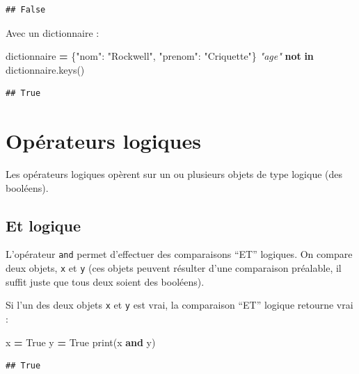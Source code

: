 \documentclass[
  12pt,
]{book}
\newenvironment{Shaded}{\begin{snugshade}}{\end{snugshade}}
\newcommand{\BuiltInTok}[1]{#1}
\newcommand{\CommentTok}[1]{\textcolor[rgb]{0.56,0.35,0.01}{\textit{#1}}}
\newcommand{\KeywordTok}[1]{\textcolor[rgb]{0.13,0.29,0.53}{\textbf{#1}}}
\newcommand{\NormalTok}[1]{#1}
\newcommand{\OperatorTok}[1]{\textcolor[rgb]{0.81,0.36,0.00}{\textbf{#1}}}
\newcommand{\StringTok}[1]{\textcolor[rgb]{0.31,0.60,0.02}{#1}}
\newcommand{\VariableTok}[1]{\textcolor[rgb]{0.00,0.00,0.00}{#1}}
\numberwithin{equation}{section}
\numberwithin{countremarque}{section}
\begin{document}
\begin{lstlisting}
## False
\end{lstlisting}

Avec un dictionnaire :

\begin{Shaded}
\begin{Highlighting}[]
\NormalTok{dictionnaire }\OperatorTok{=}\NormalTok{ \{}\StringTok{"nom"}\NormalTok{: }\StringTok{"Rockwell"}\NormalTok{, }\StringTok{"prenom"}\NormalTok{: }\StringTok{"Criquette"}\NormalTok{\}}
\CommentTok{"age"} \KeywordTok{not} \KeywordTok{in}\NormalTok{ dictionnaire.keys()}
\end{Highlighting}
\end{Shaded}

\begin{lstlisting}
## True
\end{lstlisting}

\section{Opérateurs logiques}\label{operateurs-logiques}

Les opérateurs logiques opèrent sur un ou plusieurs objets de type logique (des booléens).

\subsection{Et logique}\label{et-logique}

L'opérateur \texttt{and} permet d'effectuer des comparaisons ``ET'' logiques. On compare deux objets, \texttt{x} et \texttt{y} (ces objets peuvent résulter d'une comparaison préalable, il suffit juste que tous deux soient des booléens).

Si l'un des deux objets \texttt{x} et \texttt{y} est vrai, la comparaison ``ET'' logique retourne vrai :

\begin{Shaded}
\begin{Highlighting}[]
\NormalTok{x }\OperatorTok{=} \VariableTok{True}
\NormalTok{y }\OperatorTok{=} \VariableTok{True}
\BuiltInTok{print}\NormalTok{(x }\KeywordTok{and}\NormalTok{ y)}
\end{Highlighting}
\end{Shaded}

\begin{lstlisting}
## True
\end{lstlisting}
\end{document}
